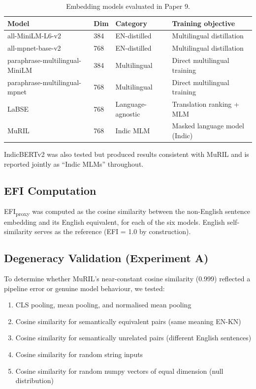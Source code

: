 \documentclass[11pt,a4paper]{article}
\begin{document}
\begin{table}[H]
\centering
\caption{Embedding models evaluated in Paper 9.}
\label{tab:models}
\begin{tabular}{llll}
\toprule
\textbf{Model} & \textbf{Dim} & \textbf{Category} & \textbf{Training objective} \\
\midrule
all-MiniLM-L6-v2        & 384  & EN-distilled   & Multilingual distillation \\
all-mpnet-base-v2       & 768  & EN-distilled   & Multilingual distillation \\
paraphrase-multilingual-MiniLM & 384 & Multilingual & Direct multilingual training \\
paraphrase-multilingual-mpnet  & 768 & Multilingual & Direct multilingual training \\
LaBSE                   & 768  & Language-agnostic & Translation ranking + MLM \\
MuRIL                   & 768  & Indic MLM      & Masked language model (Indic) \\
\bottomrule
\end{tabular}
\end{table}

IndicBERTv2 was also tested but produced results consistent with MuRIL and is reported
jointly as ``Indic MLMs'' throughout.

\subsection{EFI Computation}

EFI\textsubscript{proxy} was computed as the cosine similarity between the non-English
sentence embedding and its English equivalent, for each of the six models. English
self-similarity serves as the reference (EFI = 1.0 by construction).

\subsection{Degeneracy Validation (Experiment A)}

To determine whether MuRIL's near-constant cosine similarity (0.999) reflected a pipeline
error or genuine model behaviour, we tested:
\begin{enumerate}
    \item CLS pooling, mean pooling, and normalised mean pooling
    \item Cosine similarity for semantically equivalent pairs (same meaning EN-KN)
    \item Cosine similarity for semantically unrelated pairs (different English sentences)
    \item Cosine similarity for random string inputs
    \item Cosine similarity for random numpy vectors of equal dimension (null distribution)
\end{enumerate}
\end{document}
